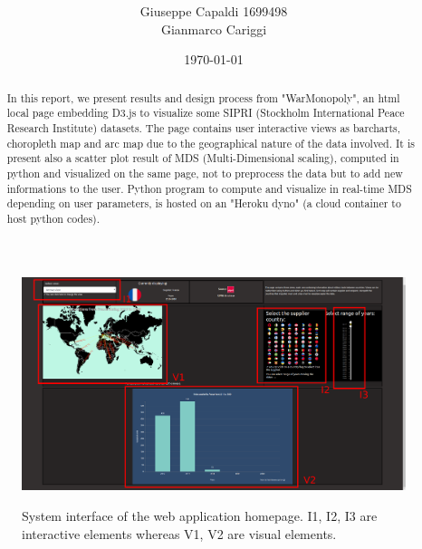 \documentclass{article}
\title{\vspace{-2.0cm}\spacecaps{WarMonopoly: Visual Analytics of Arms Transfer}\\ \normalsize \spacesc{Visual Analytics Course Sapienza University of Rome} }
\author{Giuseppe Capaldi 1699498\\ Gianmarco Cariggi}
\date{\today}
\begin{document}
\maketitle




\begin{figure}[ht!]
\centering
\includegraphics[scale=0.25,center]{fig/va.png}
   \label{fig:va}
    \caption{System interface of the web application homepage. I1, I2, I3 are interactive elements whereas V1, V2 are visual elements. }

\end{figure}
    
    
\begin{abstract}
%
In this report, we present results and design process from "WarMonopoly", an html local page embedding D3.js to visualize some SIPRI (Stockholm International Peace Research Institute) datasets. The page contains user interactive views as barcharts, choropleth map and arc map due to the geographical nature of the data involved. It is present also a scatter plot result of MDS (Multi-Dimensional scaling), computed in python and visualized on the same page, not to preprocess the data but to add new informations to the user. Python program to compute and visualize in real-time MDS depending on user parameters, is hosted on an "Heroku dyno" (a cloud container to host python codes).


%
\end{abstract}
\end{document}
